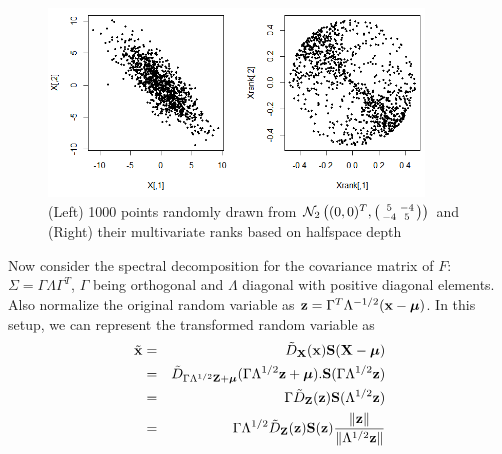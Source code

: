 \documentclass[fleqn,12pt]{article}
\begin{document}
\begin{figure}[t]
	\captionsetup{singlelinecheck=off}
	\centering
		\includegraphics[height=5cm]{../Codes/rankplot.png}
	\caption{(Left) 1000 points randomly drawn from $\mathcal N_2\left((0,0)^T, \left(\protect\begin{smallmatrix} 5 & -4 \\ -4 & 5 \protect\end{smallmatrix}\right)\right) $ and (Right) their multivariate ranks based on halfspace depth}
	\label{fig:rankplot}
\end{figure}

Now consider the spectral decomposition for the covariance matrix of $F$: $\Sigma = \Gamma\Lambda\Gamma^T$, $\Gamma$ being orthogonal and $\Lambda$ diagonal with positive diagonal elements. Also normalize the original random variable as ${\bf{z}} = \Gamma^T\Lambda^{-1/2} ({\bf{x}} - {\boldsymbol{\mu}})$. In this setup, we can represent the transformed random variable as
\begin{eqnarray*}
\tilde {{\bf{x}}} &=& \tilde D_{{\mathbf{X}}} ({\bf{x}}) {\mathbf{S}}({\mathbf{X}} - {\boldsymbol{\mu}})\\
&=& \tilde D_{\Gamma\Lambda^{1/2}{\mathbf{Z}} + {\boldsymbol{\mu}}} (\Gamma\Lambda^{1/2} {\bf{z}} + {\boldsymbol{\mu}}). {\mathbf{S}}(\Gamma\Lambda^{1/2} {\bf{z}})\\
&=& \Gamma \tilde D_{{\mathbf{Z}}}({\bf{z}}) {\mathbf{S}}(\Lambda^{1/2}{\bf{z}})\\
&=& \Gamma \Lambda^{1/2} \tilde D_{{\mathbf{Z}}}({\bf{z}}) {\mathbf{S}}({\bf{z}}) \frac{\| {\bf{z}} \|}{\|\Lambda^{1/2} {\bf{z}}\|}
\end{eqnarray*}

\end{document}

